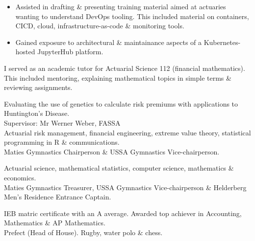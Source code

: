 \documentclass[10pt,a4paper,ragged2e,withhyper]{altacv}
\begin{document}
\begin{paracol}{2}
  \begin{itemize}[label=$\circ$, leftmargin=0.9cm, labelsep=0.43cm]
    \item Assisted in drafting \& presenting training material aimed at actuaries wanting to understand DevOps tooling. This included material on containers, CICD, cloud, infrastructure-as-code \& monitoring tools. 
    \item Gained exposure to architectural \& maintainance aspects of a Kubernetes-hosted JupyterHub platform. 
  \end{itemize}

  \medskip 

  \smallskip
  I served as an academic tutor for Actuarial Science 112 (financial mathematics).\\ This included mentoring, explaining mathematical topics in simple terms \& reviewing assignments. 

  \bigskip 
  

  \smallskip
  \smallskip
  Evaluating the use of genetics to calculate risk premiums with applications to \\Huntington's Disease.\\

  Supervisor: Mr Werner Weber, FASSA\\
  \smallskip
  Actuarial risk management, financial engineering, extreme value theory, statistical programming in R \& communications.\\
  \smallskip
  Maties Gymnastics Chairperson \& USSA Gymnastics Vice-chairperson. 

  \medskip
  \smallskip
  Actuarial science, mathematical statistics, computer science, mathematics \& \\economics.\\
  \smallskip
  Maties Gymnastics Treasurer, USSA Gymnastics Vice-chairperson \& Helderberg Men's Residence Entrance Captain.

  \medskip
  \smallskip
  IEB matric certificate with an A average. Awarded top achiever in Accounting, \\Mathematics \& AP Mathematics.\\
  \smallskip
  Prefect (Head of House). Rugby, water polo \& chess.



\end{paracol}
\end{document}
